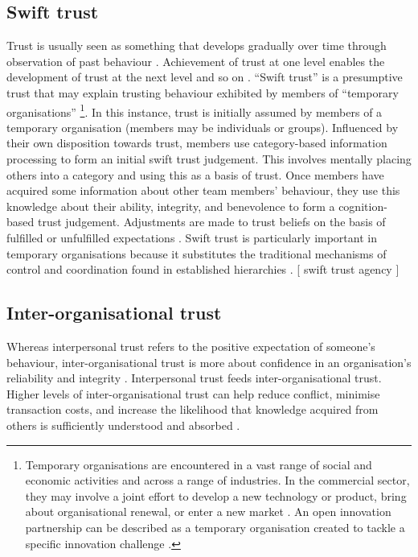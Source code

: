 \subsection{Swift trust}

Trust is usually seen as something that develops gradually over time through observation of past behaviour \citep{mayer1995integrative}. Achievement of trust at one level enables the development of trust at the next level and so on \citep{robert2009individual}. \enquote{Swift trust} is a presumptive trust that may explain trusting behaviour exhibited by members of \enquote{temporary organisations} \footnote{Temporary organisations are encountered in a vast range of social and economic activities and across a range of industries. In the commercial sector, they may involve a joint effort to develop a new technology or product, bring about organisational renewal, or enter a new market \citep{janowicz2009research}. An open innovation partnership can be described as a temporary organisation created to tackle a specific innovation challenge \citep{cococcioni2014exploring}.}. In this instance, trust is initially assumed by members of a temporary organisation (members may be individuals or groups). Influenced by their own disposition towards trust, members use category-based information processing to form an initial swift trust judgement. This involves mentally placing others into a category and using this as a basis of trust. Once members have acquired some information about other team members' behaviour, they use this knowledge about their ability, integrity, and benevolence to form a cognition-based trust judgement. Adjustments are made to trust beliefs on the basis of fulfilled or unfulfilled expectations \citep{meyerson1996swift,robert2009individual}. Swift trust is particularly important in temporary organisations because it substitutes the traditional mechanisms of control and coordination found in established hierarchies \citep{kasper2001communicating}. [ swift trust agency ] \medskip

\subsection{Inter-organisational trust}

Whereas interpersonal trust refers to the positive expectation of someone's behaviour, inter-organisational trust is more about confidence in an organisation's reliability and integrity \citep{zaheer1998does,ashnai2016inter}. Interpersonal trust feeds inter-organisational trust. Higher levels of inter-organisational trust can help reduce conflict, minimise transaction costs, and increase the likelihood that knowledge acquired from others is sufficiently understood and absorbed \citep{zaheer1998does,abrams2003nurturing,levin2004strength}. \medskip

